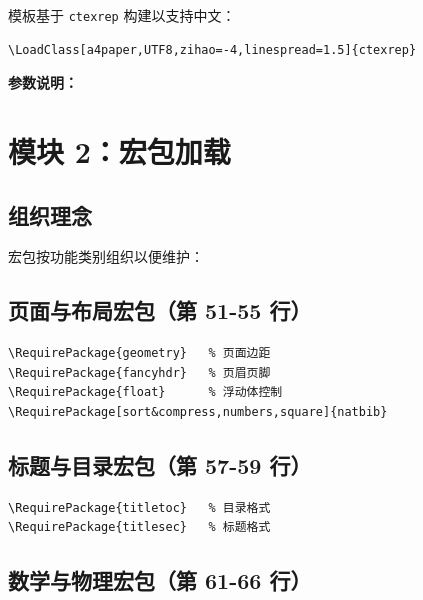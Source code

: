 \documentclass[linux]{hustreport}
\begin{document}
模板基于 \texttt{ctexrep} 构建以支持中文：

\begin{verbatim}
\LoadClass[a4paper,UTF8,zihao=-4,linespread=1.5]{ctexrep}
\end{verbatim}

\textbf{参数说明：}
\begin{optionlist}
\end{optionlist}

\newpage
\section{模块 2：宏包加载}

\subsection{组织理念}

宏包按功能类别组织以便维护：

\subsection{页面与布局宏包（第 51-55 行）}

\begin{verbatim}
\RequirePackage{geometry}   % 页面边距
\RequirePackage{fancyhdr}   % 页眉页脚
\RequirePackage{float}      % 浮动体控制
\RequirePackage[sort&compress,numbers,square]{natbib}
\end{verbatim}

\subsection{标题与目录宏包（第 57-59 行）}

\begin{verbatim}
\RequirePackage{titletoc}   % 目录格式
\RequirePackage{titlesec}   % 标题格式
\end{verbatim}

\subsection{数学与物理宏包（第 61-66 行）}
\end{document}
